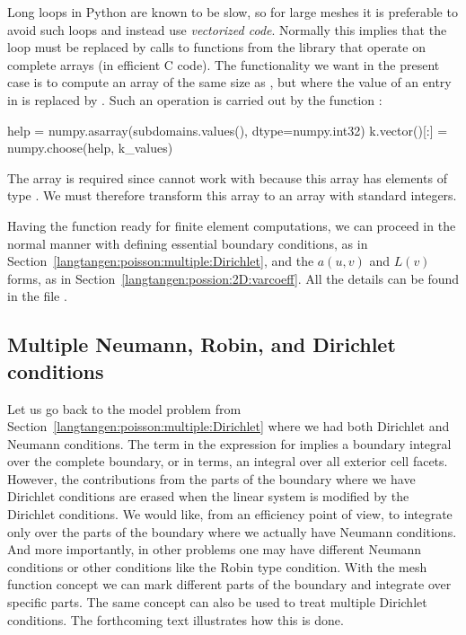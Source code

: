 Long loops in Python are known to be slow, so for large meshes it is
preferable to avoid such loops and instead use \emph{vectorized code}.
Normally this implies that the loop must be replaced by calls to
functions from the  library that operate on complete arrays
(in efficient C code). The functionality we want in the present case
is to compute an array of the same size as ,
but where the value  of an entry in 
is replaced by .  Such an operation is carried out by
the  function :
\begin{python}
help = numpy.asarray(subdomains.values(), dtype=numpy.int32)
k.vector()[:] = numpy.choose(help, k_values)
\end{python}
The  array is required since  cannot work with
 because this array has elements of type
. We must therefore transform this array to an array
 with standard  integers.

Having the  function ready for finite element
computations, we can proceed in the normal manner
with defining essential boundary conditions, as in
Section~\ref{langtangen:poisson:multiple:Dirichlet}, and the $a(u,v)$
and $L(v)$ forms, as in Section~\ref{langtangen:possion:2D:varcoeff}.
All the details can be found in the file .

\subsection{Multiple Neumann, Robin, and Dirichlet conditions}
\label{langtangen:poisson:mat:neumann}

Let us go back to the model problem from
Section~\ref{langtangen:poisson:multiple:Dirichlet} where we had both
Dirichlet and Neumann conditions.  The term  in the expression
for  implies a boundary integral over the complete boundary,
or in \fenics{} terms, an integral over all exterior cell facets.
However, the contributions from the parts of the boundary where we have
Dirichlet conditions are erased when the linear system is modified by the
Dirichlet conditions.  We would like, from an efficiency point of view,
to integrate  only over the parts of the boundary where
we actually have Neumann conditions.  And more importantly, in other
problems one may have different Neumann conditions or other conditions
like the Robin type condition.  With the mesh function concept we can
mark different parts of the boundary and integrate over specific parts.
The same concept can also be used to treat multiple Dirichlet conditions.
The forthcoming text illustrates how this is done.

